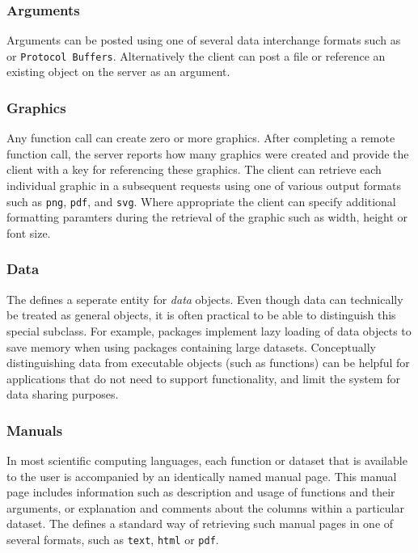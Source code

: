 \subsubsection{Arguments}

Arguments can be posted using one of several data interchange formats such as \JSON or \texttt{Protocol Buffers}. Alternatively the client can post a file or reference an existing object on the server as an argument.  





\subsubsection{Graphics}

Any function call can create zero or more graphics. After completing a remote function call, the server reports how many graphics were created and provide the client with a key for referencing these graphics. The client can retrieve each individual graphic in a subsequent requests using one of various output formats such as \texttt{png}, \texttt{pdf}, and \texttt{svg}. Where appropriate the client can specify additional formatting paramters during the retrieval of the graphic such as width, height or font size.

\subsubsection{Data}

The \API defines a seperate entity for \emph{data} objects. Even though data can technically be treated as general objects, it is often practical to be able to distinguish this special subclass. For example, \R packages implement lazy loading of data objects to save memory when using packages containing large datasets. Conceptually distinguishing data from executable objects (such as functions) can be helpful for applications that do not need to support \RPC functionality, and limit the system for data sharing purposes.

\subsubsection{Manuals}

In most scientific computing languages, each function or dataset that is available to the user is accompanied by an identically named manual page. This manual page includes information such as description and usage of functions and their arguments, or explanation and comments about the columns within a particular dataset. The \API defines a standard way of retrieving such manual pages in one of several formats, such as \texttt{text}, \texttt{html} or \texttt{pdf}.

